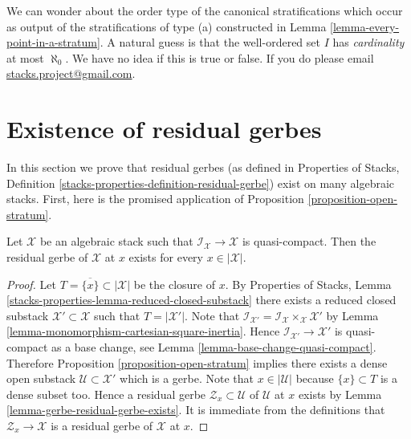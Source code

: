 \begin{remark}
\label{remark-order-type}
We can wonder about the order type of the canonical stratifications which
occur as output of the stratifications of type (a) constructed in
Lemma \ref{lemma-every-point-in-a-stratum}.
A natural guess is that the well-ordered set $I$ has
{\it cardinality} at most $\aleph_0$. We have no idea if this is true
or false. If you do please email
\href{mailto:stacks.project@gmail.com}{stacks.project@gmail.com}.
\end{remark}





\section{Existence of residual gerbes}
\label{section-existence-residual-gerbes}

\noindent
In this section we prove that residual gerbes (as defined in
Properties of Stacks, Definition
\ref{stacks-properties-definition-residual-gerbe})
exist on many algebraic stacks. First, here is the promised
application of
Proposition \ref{proposition-open-stratum}.

\begin{lemma}
\label{lemma-every-point-residual-gerbe}
Let $\mathcal{X}$ be an algebraic stack such that
$\mathcal{I}_\mathcal{X} \to \mathcal{X}$ is quasi-compact.
Then the residual gerbe of $\mathcal{X}$ at $x$ exists for
every $x \in |\mathcal{X}|$.
\end{lemma}

\begin{proof}
Let $T = \overline{\{x\}} \subset |\mathcal{X}|$ be the closure of $x$.
By
Properties of Stacks, Lemma
\ref{stacks-properties-lemma-reduced-closed-substack}
there exists a reduced closed substack $\mathcal{X}' \subset \mathcal{X}$
such that $T = |\mathcal{X}'|$. Note that
$\mathcal{I}_{\mathcal{X}'} =
\mathcal{I}_\mathcal{X} \times_\mathcal{X} \mathcal{X}'$ by
Lemma \ref{lemma-monomorphism-cartesian-square-inertia}.
Hence $\mathcal{I}_{\mathcal{X}'} \to \mathcal{X}'$ is
quasi-compact as a base change, see
Lemma \ref{lemma-base-change-quasi-compact}.
Therefore
Proposition \ref{proposition-open-stratum}
implies there exists a dense open substack
$\mathcal{U} \subset \mathcal{X}'$
which is a gerbe. Note that $x \in |\mathcal{U}|$ because $\{x\} \subset T$
is a dense subset too. Hence a residual gerbe
$\mathcal{Z}_x \subset \mathcal{U}$ of $\mathcal{U}$ at $x$ exists by
Lemma \ref{lemma-gerbe-residual-gerbe-exists}.
It is immediate from the definitions that $\mathcal{Z}_x \to \mathcal{X}$
is a residual gerbe of $\mathcal{X}$ at $x$.
\end{proof}

